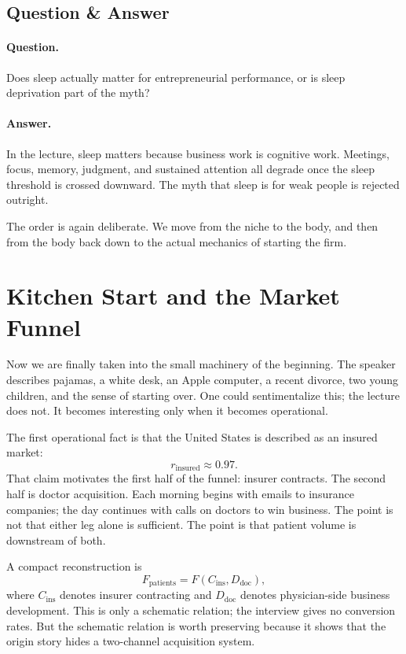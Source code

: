 \subsection{Question \& Answer}

\paragraph{Question.} Does sleep actually matter for entrepreneurial performance, or is sleep deprivation part of the myth?

\paragraph{Answer.} In the lecture, sleep matters because business work is cognitive work. Meetings, focus, memory, judgment, and sustained attention all degrade once the sleep threshold is crossed downward. The myth that sleep is for weak people is rejected outright.

The order is again deliberate. We move from the niche to the body, and then from the body back down to the actual mechanics of starting the firm.

\section{Kitchen Start and the Market Funnel}

Now we are finally taken into the small machinery of the beginning. The speaker describes pajamas, a white desk, an Apple computer, a recent divorce, two young children, and the sense of starting over. One could sentimentalize this; the lecture does not. It becomes interesting only when it becomes operational.

The first operational fact is that the United States is described as an insured market:
\begin{equation}
r_{\text{insured}} \approx 0.97.
\end{equation}
That claim motivates the first half of the funnel: insurer contracts. The second half is doctor acquisition. Each morning begins with emails to insurance companies; the day continues with calls on doctors to win business. The point is not that either leg alone is sufficient. The point is that patient volume is downstream of both.

A compact reconstruction is
\begin{equation}
F_{\text{patients}} = F(C_{\text{ins}},D_{\text{doc}}),
\end{equation}
where \(C_{\text{ins}}\) denotes insurer contracting and \(D_{\text{doc}}\) denotes physician-side business development. This is only a schematic relation; the interview gives no conversion rates. But the schematic relation is worth preserving because it shows that the origin story hides a two-channel acquisition system.

